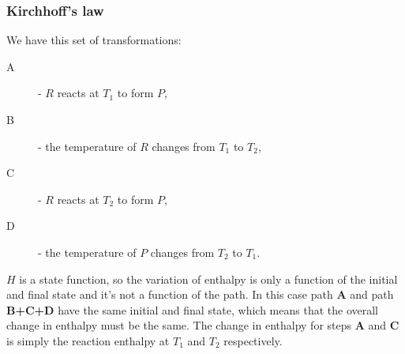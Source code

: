 \documentclass[12pt,a4paper]{report}
\begin{document}
   \subsubsection*{Kirchhoff's law}
   We have this set of transformations:
   \begin{description}
   

   \item[A]- $R$ reacts at $T_{1}$ to form $P$,
   \item[B]- the temperature of $R$ changes from $T_{1}$ to $T_{2}$,
   \item[C]- $R$ reacts at $T_{2}$ to form $P$,
   \item[D]- the temperature of $P$ changes from $T_{2}$ to $T_{1}$.
   \end{description}
   \begin{center}
   \end{center}
   $H$ is a state function, so the variation of enthalpy is only a function of the initial and final state and it's not a function of the path. In this case path \textbf{A} and path \textbf{B+C+D} have the same initial and final state, which means that the overall change in enthalpy must be the same. The change in enthalpy for steps \textbf{A} and \textbf{C} is simply the reaction enthalpy at $T_{1}$ and $T_{2}$ respectively. 
   
\end{document}
